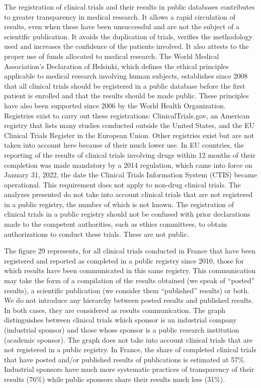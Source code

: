 \documentclass[
]{article}
\begin{document}
The registration of clinical trials and their results in public
databases contributes to greater transparency in medical research. It
allows a rapid circulation of results, even when these have been
unsuccessful and are not the subject of a scientific publication. It
avoids the duplication of trials, verifies the methodology used and
increases the confidence of the patients involved. It also attests to
the proper use of funds allocated to medical research. The World Medical
Association's Declaration of Helsinki, which defines the ethical
principles applicable to medical research involving human subjects,
establishes since 2008 that all clinical trials should be registered in
a public database before the first patient is enrolled and that the
results should be made public. These principles have also been supported
since 2006 by the World Health Organization. Registries exist to carry
out these registrations: ClinicalTrials.gov, an American registry that
lists many studies conducted outside the United States, and the EU
Clinical Trials Register in the European Union. Other registries exist
but are not taken into account here because of their much lower use. In
EU countries, the reporting of the results of clinical trials involving
drugs within 12 months of their completion was made mandatory by a 2014
regulation, which came into force on January 31, 2022, the date the
Clinical Trials Information System (CTIS) became operational. This
requirement does not apply to non-drug clinical trials. The analyzes
presented do not take into account clinical trials that are not
registered in a public registry, the number of which is not known. The
registration of clinical trials in a public registry should not be
confused with prior declarations made to the competent authorities, such
as ethics committees, to obtain authorizations to conduct these trials.
These are not public.

The figure 29 represents, for all clinical trials conducted in France
that have been registered and reported as completed in a public registry
since 2010, those for which results have been communicated in this same
registry. This communication may take the form of a compilation of the
results obtained (we speak of ``posted'' results), a scientific
publication (we consider them ``published'' results) or both. We do not
introduce any hierarchy between posted results and published results. In
both cases, they are considered as results communication. The graph
distinguishes between clinical trials which sponsor is an industrial
company (industrial sponsor) and those whose sponsor is a public
research institution (academic sponsor). The graph does not take into
account clinical trials that are not registered in a public registry. In
France, the share of completed clinical trials that have posted and/or
published results of publications is estimated at 57\%. Industrial
sponsors have much more systematic practices of transparency of their
results (76\%) while public sponsors share their results much less
(31\%).
\end{document}
